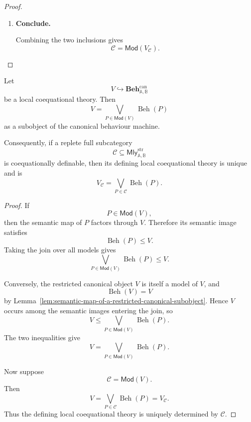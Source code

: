 \begin{proof}
\begin{enumerate}
        Since
        \[
            V_{\mathcal C}\in\mathcal C
        \]
        and \(\mathcal C\) is closed under strict homomorphic preimages, it
        follows immediately that
        \[
            X\in\mathcal C.
        \]
        Therefore
        \[
            \mathsf{Mod}(V_{\mathcal C})
            \subseteq
            \mathcal C.
        \]

        \item \textbf{Conclude.}

        Combining the two inclusions gives
        \[
            \mathcal C
            =
            \mathsf{Mod}(V_{\mathcal C}).
        \]
    \end{enumerate}
\end{proof}

\begin{corollary}
\label{cor:uniqueness-defining-local-coequational-theory}
    Let
    \[
        V\hookrightarrow
        \mathbf{Beh}^{\mathrm{can}}_{\mathbb A,\mathbb B}
    \]
    be a local coequational theory. Then
    \[
        V
        =
        \bigvee_{P\in\mathsf{Mod}(V)}
        \operatorname{Beh}(P)
    \]
    as a subobject of the canonical behaviour machine.

    Consequently, if a replete full subcategory
    \[
        \mathcal C
        \subseteq
        \mathsf{Mly}^{\mathrm{str}}_{\mathbb A,\mathbb B}
    \]
    is coequationally definable, then its defining local coequational theory
    is unique and is
    \[
        V_{\mathcal C}
        =
        \bigvee_{P\in\mathcal C}
        \operatorname{Beh}(P).
    \]
\end{corollary}

\begin{proof}
    If
    \[
        P\in\mathsf{Mod}(V),
    \]
    then the semantic map of \(P\) factors through \(V\). Therefore its
    semantic image satisfies
    \[
        \operatorname{Beh}(P)\leq V.
    \]
    Taking the join over all models gives
    \[
        \bigvee_{P\in\mathsf{Mod}(V)}
        \operatorname{Beh}(P)
        \leq
        V.
    \]

    Conversely, the restricted canonical object \(V\) is itself a model of
    \(V\), and
    \[
        \operatorname{Beh}(V)=V
    \]
    by
    Lemma~\ref{lem:semantic-map-of-a-restricted-canonical-subobject}.
    Hence \(V\) occurs among the semantic images entering the join, so
    \[
        V
        \leq
        \bigvee_{P\in\mathsf{Mod}(V)}
        \operatorname{Beh}(P).
    \]
    The two inequalities give
    \[
        V
        =
        \bigvee_{P\in\mathsf{Mod}(V)}
        \operatorname{Beh}(P).
    \]

    Now suppose
    \[
        \mathcal C=\mathsf{Mod}(V).
    \]
    Then
    \[
        V
        =
        \bigvee_{P\in\mathcal C}
        \operatorname{Beh}(P)
        =
        V_{\mathcal C}.
    \]
    Thus the defining local coequational theory is uniquely determined by
    \(\mathcal C\).
\end{proof}

